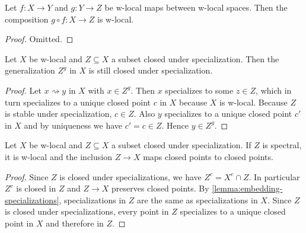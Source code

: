 \begin{lemma}
    Let \(f: X \to Y\) and \(g: Y \to Z\) be w-local maps between w-local spaces. Then the composition \(g \circ f: X \to Z\) is w-local.
    \label{thm:w-local-map-composition}
    \leanok
\end{lemma}

\begin{proof}
    Omitted.
\end{proof}

\begin{lemma}
    Let $X$ be w-local and $Z \subseteq X$ a subset closed under specialization. Then the generalization
    $Z^g$ in $X$ is still closed under specialization.
    \label{lemma:generalization-specialization-closed}
    \leanok
\end{lemma}

\begin{proof}
    Let $x \rightsquigarrow y$ in $X$ with $x \in Z^g$. Then $x$ specializes to some $z \in Z$, which
    in turn specializes to a unique closed point $c$ in $X$ because $X$ is w-local.
    Because $Z$ is stable under specialization, $c \in Z$. Also $y$ specializes to a unique closed
    point $c'$ in $X$ and by uniqueness we have $c' = c \in Z$. Hence $y \in Z^g$.
\end{proof}

\begin{lemma}
    Let $X$ be w-local and $Z \subseteq X$ a subset closed under specialization. If
    $Z$ is spectral, it is w-local and the inclusion $Z \to X$ maps closed points to closed points.
    \label{lemma:w-local-specialization-closed}
    \leanok
\end{lemma}

\begin{proof}
    Since $Z$ is closed under specializations, we have $Z^c = X^c \cap Z$. In particular
    $Z^c$ is closed in $Z$ and $Z \to X$ preserves closed points.
    By \ref{lemma:embedding-specializations}, specializations
    in $Z$ are the same as specializations in $X$. Since $Z$ is closed
    under specializations, every point in $Z$ specializes to a unique
    closed point in $X$ and therefore in $Z$.
\end{proof}

